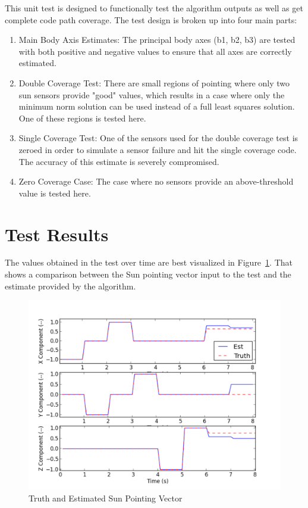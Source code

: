 \documentclass[]{BasiliskReportMemo}
\begin{document}
\noindent This unit test is designed to functionally test the algorithm 
outputs as well as get complete code path coverage.  The test design is broken 
up into four main parts:\\
\begin{enumerate}
\item{Main Body Axis Estimates: The principal body axes (b1, b2, b3) are tested 
   with both positive and negative values to ensure that all axes are correctly 
   estimated.}
\item{Double Coverage Test: There are small regions of pointing where only two 
   sun sensors provide "good" values, which results in a case where only the 
   minimum norm solution can be used instead of a full least squares solution.  
   One of these regions is tested here.}
\item{Single Coverage Test: One of the sensors used for the double coverage test 
   is zeroed in order to simulate a sensor failure and hit the single coverage 
   code.  The accuracy of this estimate is severely compromised.}
\item{Zero Coverage Case: The case where no sensors provide an above-threshold 
   value is tested here.}
\end{enumerate}


\section{Test Results}

The values obtained in the test over time are best visualized in 
Figure~\ref{fig:point_fig}.  That shows a comparison between the Sun pointing 
vector input to the test and the estimate provided by the algorithm.
\begin{figure}[htb]
        \centerline{
        \includegraphics[scale=0.5]{Figures/sunEstAccuracy}
        }
        \caption{Truth and Estimated Sun Pointing Vector}
        \label{fig:point_fig}
\end{figure}
\end{document}
